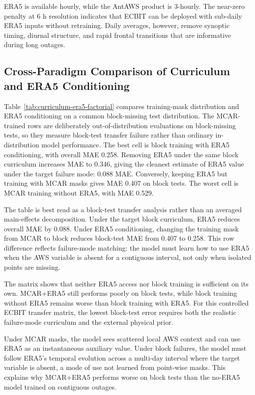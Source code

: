 ERA5 is available hourly, while the AntAWS product is 3-hourly. The near-zero penalty at 6 h resolution indicates that ECBIT can be deployed with sub-daily ERA5 inputs without retraining. Daily averages, however, remove synoptic timing, diurnal structure, and rapid frontal transitions that are informative during long outages.

\subsection{Cross-Paradigm Comparison of Curriculum and ERA5 Conditioning}
Table~\ref{tab:curriculum-era5-factorial} compares training-mask distribution and ERA5 conditioning on a common block-missing test distribution. The MCAR-trained rows are deliberately out-of-distribution evaluations on block-missing tests, so they measure block-test transfer failure rather than ordinary in-distribution model performance. The best cell is block training with ERA5 conditioning, with overall MAE 0.258. Removing ERA5 under the same block curriculum increases MAE to 0.346, giving the cleanest estimate of ERA5 value under the target failure mode: 0.088 MAE. Conversely, keeping ERA5 but training with MCAR masks gives MAE 0.407 on block tests. The worst cell is MCAR training without ERA5, with MAE 0.529.



The table is best read as a block-test transfer analysis rather than an averaged main-effects decomposition. Under the target block curriculum, ERA5 reduces overall MAE by 0.088. Under ERA5 conditioning, changing the training mask from MCAR to block reduces block-test MAE from 0.407 to 0.258. This row difference reflects failure-mode matching: the model must learn how to use ERA5 when the AWS variable is absent for a contiguous interval, not only when isolated points are missing.

The matrix shows that neither ERA5 access nor block training is sufficient on its own. MCAR+ERA5 still performs poorly on block tests, while block training without ERA5 remains worse than block training with ERA5. For this controlled ECBIT transfer matrix, the lowest block-test error requires both the realistic failure-mode curriculum and the external physical prior.

Under MCAR masks, the model sees scattered local AWS context and can use ERA5 as an instantaneous auxiliary value. Under block failures, the model must follow ERA5's temporal evolution across a multi-day interval where the target variable is absent, a mode of use not learned from point-wise masks. This explains why MCAR+ERA5 performs worse on block tests than the no-ERA5 model trained on contiguous outages.

